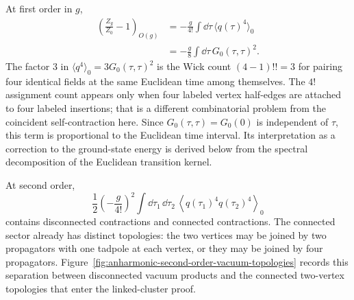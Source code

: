 At first order in \(g\),
\begin{equation}
  \label{eq:anharmonic-leading-correction}
  \begin{aligned}
  \left(\frac{Z_g}{Z_0}-1\right)_{O(g)}
  &=
  -\frac{g}{4!}\int\dd\tau\,\langle q(\tau)^4\rangle_0
  \\
  &=
  -\frac{g}{8}\int\dd\tau\,G_0(\tau,\tau)^2 .
  \end{aligned}
\end{equation}
The factor \(3\) in \(\langle q^4\rangle_0=3G_0(\tau,\tau)^2\) is the Wick
count \((4-1)!!=3\) for pairing four identical fields at the same Euclidean
time among themselves.  The \(4!\) assignment count appears only when four
labeled vertex half-edges are attached to four labeled insertions; that is a
different combinatorial problem from the coincident self-contraction here.
Since \(G_0(\tau,\tau)=G_0(0)\) is independent of \(\tau\), this term is
proportional to the Euclidean time interval.  Its interpretation as a correction
to the ground-state energy is derived below from the spectral decomposition of
the Euclidean transition kernel.

At second order,
\[
  \frac12\left(-\frac{g}{4!}\right)^2
  \int\dd\tau_1\,\dd\tau_2\,
  \left\langle q(\tau_1)^4q(\tau_2)^4\right\rangle_0
\]
contains disconnected contractions and connected contractions.  The connected
sector already has distinct topologies: the two vertices may be joined by two
propagators with one tadpole at each vertex, or they may be joined by four
propagators.  Figure~\ref{fig:anharmonic-second-order-vacuum-topologies}
records this separation between disconnected vacuum products and the connected
two-vertex topologies that enter the linked-cluster proof.

